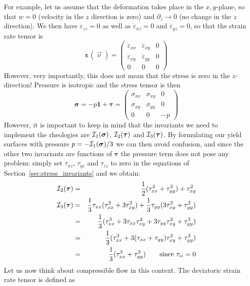 For example, let us assume that the deformation takes place in the $x,y$-plane,
so that $w=0$ (velocity in the $z$ direction is zero) and $\partial_z \rightarrow 0$ (no change in the $z$ direction).
We then have $\dot{\varepsilon}_{zz}=0$ as well as $\dot{\varepsilon}_{xz}=0$ and $\dot{\varepsilon}_{yz}=0$, so
that the strain rate tensor is 
\[
\dot{\bm \varepsilon}(\vec\upnu)=
\left( \begin{array}{ccc}
\dot{\varepsilon}_{xx} & \dot{\varepsilon}_{xy} & 0 \\
\dot{\varepsilon}_{xy} & \dot{\varepsilon}_{yy} & 0 \\
0 & 0 & 0
\end{array}\right)
\]
However, very importantly, this does not mean that the stress is zero in the $z$-direction! Pressure is 
isotropic and the stress tensor is then 
\[
{\bm \sigma}=
-p {\bm 1} + {\bm \tau} =
\left( \begin{array}{ccc}
{\sigma}_{xx} & {\sigma}_{xy} & 0 \\
{\sigma}_{xy} & {\sigma}_{yy} & 0 \\
0 & 0 & -p
\end{array}\right)
\]
However, it is important to keep in mind that the invariants we need to implement 
the rheologies are ${\cal I}_1({\bm \sigma})$,  ${\cal I}_2({\bm \tau})$ and ${\cal I}_3({\bm \tau})$.
By formulating our yield surfaces with pressure $p=-{\cal I}_1({\bm \sigma})/3$ we can then 
avoid confusion, and since the other two invariants are functions of ${\bm \tau}$ the pressure 
term does not pose any problem: simply set $\tau_{xz}$, $\tau_{yz}$ and $\tau_{zz}$ to zero in the 
equations of Section~\ref{sec:stress_invariants} and we obtain:
\begin{eqnarray}
{\cal I}_2({\bm \tau}) &=&\frac{1}{2}(\tau_{xx}^2 + \tau_{yy}^2 ) + \tau_{xy}^2 \\ 
{\cal I}_3({\bm \tau}) 
&=& \frac{1}{3} \tau_{xx} (  \tau_{xx}^2 + 3 \tau_{xy}^2 ) 
+ \frac{1}{3} \tau_{yy} (3 \tau_{xy}^2 +   \tau_{yy}^2 )   \nonumber\\
&=& \frac{1}{3}(  \tau_{xx}^3 + 3 \tau_{xx}\tau_{xy}^2  
+ 3 \tau_{yy} \tau_{xy}^2 +   \tau_{yy}^3 )   \nonumber\\
&=& \frac{1}{3}(  \tau_{xx}^3 + 3 (\tau_{xx}+\tau_{yy}) \tau_{xy}^2  +  \tau_{yy}^3 )   \nonumber\\
&=& \frac{1}{3}(  \tau_{xx}^3 +  \tau_{yy}^3 )  \qquad \text{since } \tau_{ii}=0 
\end{eqnarray}
Let us now think about compressible flow in this context. 
The deviatoric strain rate tensor is defined as 
